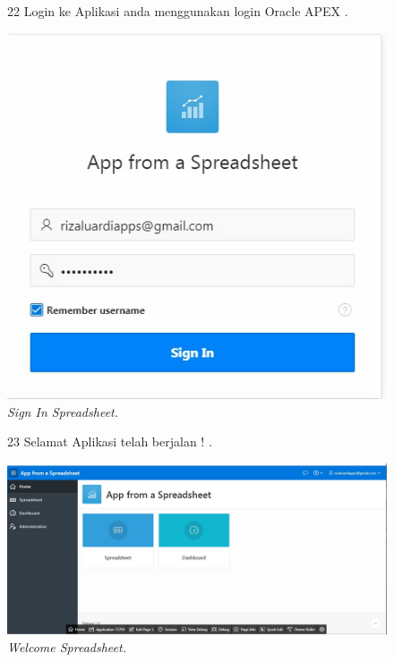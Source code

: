 \begin{enumerate}
\begin{figure}
\item[22]Login ke Aplikasi anda menggunakan login Oracle APEX .

    \begin{center}
\includegraphics[scale=0.4]{figures/create5.jpg}
    \caption{\textit{Sign In Spreadsheet.}}
        \end{center}
\label{gambar}
\end{figure}

\begin{figure}
\item[23]Selamat Aplikasi telah berjalan ! .

    \begin{center}
\includegraphics[scale=0.4]{figures/congratz.jpg}
    \caption{\textit{Welcome Spreadsheet.}}
        \end{center}
\label{gambar}
\end{figure}

\end{enumerate}
